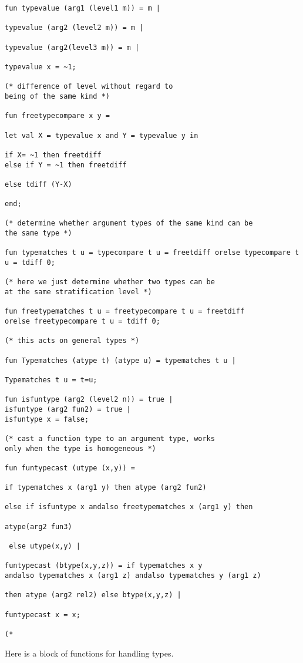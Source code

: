 \documentclass{article}
\begin{document}
{{\begin{verbatim}
fun typevalue (arg1 (level1 m)) = m |

typevalue (arg2 (level2 m)) = m |

typevalue (arg2(level3 m)) = m |

typevalue x = ~1;

(* difference of level without regard to
being of the same kind *)

fun freetypecompare x y =

let val X = typevalue x and Y = typevalue y in

if X= ~1 then freetdiff
else if Y = ~1 then freetdiff

else tdiff (Y-X)

end;

(* determine whether argument types of the same kind can be
the same type *)

fun typematches t u = typecompare t u = freetdiff orelse typecompare t u = tdiff 0;

(* here we just determine whether two types can be
at the same stratification level *)

fun freetypematches t u = freetypecompare t u = freetdiff 
orelse freetypecompare t u = tdiff 0;

(* this acts on general types *)

fun Typematches (atype t) (atype u) = typematches t u |

Typematches t u = t=u;

fun isfuntype (arg2 (level2 n)) = true |
isfuntype (arg2 fun2) = true |
isfuntype x = false;

(* cast a function type to an argument type, works
only when the type is homogeneous *)

fun funtypecast (utype (x,y)) =

if typematches x (arg1 y) then atype (arg2 fun2)

else if isfuntype x andalso freetypematches x (arg1 y) then 

atype(arg2 fun3)

 else utype(x,y) |

funtypecast (btype(x,y,z)) = if typematches x y 
andalso typematches x (arg1 z) andalso typematches y (arg1 z)

then atype (arg2 rel2) else btype(x,y,z) |

funtypecast x = x;

(*

\end{verbatim}

Here is a block of functions for handling types.

}}
\end{document}
